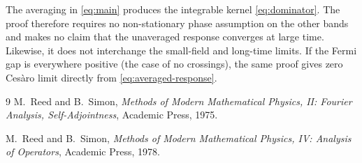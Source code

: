 \documentclass[11pt,a4paper]{article}
\numberwithin{equation}{section}
\theoremstyle{remark}
\begin{document}
The averaging in \eqref{eq:main} produces the integrable kernel
\eqref{eq:dominator}. The proof therefore requires no non-stationary
phase assumption on the other bands and makes no claim that the
unaveraged response converges at large time. Likewise, it does not
interchange the small-field and long-time limits. If the Fermi gap is
everywhere positive (the case of no crossings), the same proof gives
zero Ces\`aro limit directly from \eqref{eq:averaged-response}.

\begin{thebibliography}{9}
M.~Reed and B.~Simon,
\emph{Methods of Modern Mathematical Physics, II:
Fourier Analysis, Self-Adjointness},
Academic Press, 1975.

M.~Reed and B.~Simon,
\emph{Methods of Modern Mathematical Physics, IV:
Analysis of Operators},
Academic Press, 1978.
\end{thebibliography}
\end{document}
